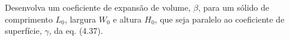 Desenvolva um coeficiente de expansão de volume, $\beta$, para um sólido de comprimento $L_0$, largura $W_0$ e altura $H_0$, que seja paralelo ao coeficiente de superfície, $\gamma$, da eq. (4.37).

